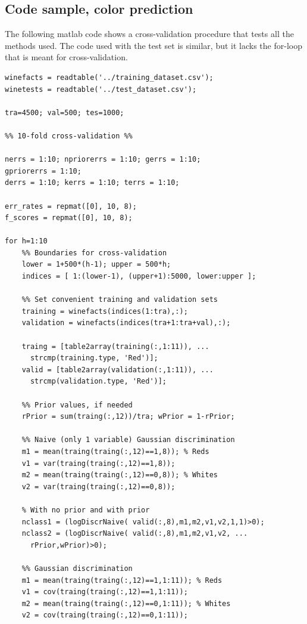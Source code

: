 \documentclass[twoside]{article}
\begin{document}
\begin{multicols}{2}
\section{Code sample, color prediction}\label{appendix:colorcode}

The following matlab code shows a cross-validation procedure
that tests all the methods used. The code used with the test
set is similar, but it lacks the for-loop that is meant for 
cross-validation.

{\footnotesize

\begin{verbatim}
winefacts = readtable('../training_dataset.csv');
winetests = readtable('../test_dataset.csv');

tra=4500; val=500; tes=1000;

%% 10-fold cross-validation %%

nerrs = 1:10; npriorerrs = 1:10; gerrs = 1:10; 
gpriorerrs = 1:10;
derrs = 1:10; kerrs = 1:10; terrs = 1:10;

err_rates = repmat([0], 10, 8); 
f_scores = repmat([0], 10, 8); 

for h=1:10
    %% Boundaries for cross-validation
    lower = 1+500*(h-1); upper = 500*h;
    indices = [ 1:(lower-1), (upper+1):5000, lower:upper ];

    %% Set convenient training and validation sets
    training = winefacts(indices(1:tra),:);
    validation = winefacts(indices(tra+1:tra+val),:);

    traing = [table2array(training(:,1:11)), ... 
      strcmp(training.type, 'Red')];
    valid = [table2array(validation(:,1:11)), ... 
      strcmp(validation.type, 'Red')];

    %% Prior values, if needed
    rPrior = sum(traing(:,12))/tra; wPrior = 1-rPrior;

    %% Naive (only 1 variable) Gaussian discrimination
    m1 = mean(traing(traing(:,12)==1,8)); % Reds
    v1 = var(traing(traing(:,12)==1,8));
    m2 = mean(traing(traing(:,12)==0,8)); % Whites
    v2 = var(traing(traing(:,12)==0,8));

    % With no prior and with prior
    nclass1 = (logDiscrNaive( valid(:,8),m1,m2,v1,v2,1,1)>0);
    nclass2 = (logDiscrNaive( valid(:,8),m1,m2,v1,v2, ... 
      rPrior,wPrior)>0);

    %% Gaussian discrimination
    m1 = mean(traing(traing(:,12)==1,1:11)); % Reds
    v1 = cov(traing(traing(:,12)==1,1:11));
    m2 = mean(traing(traing(:,12)==0,1:11)); % Whites
    v2 = cov(traing(traing(:,12)==0,1:11));


\end{verbatim}}
\end{multicols}
\end{document}
